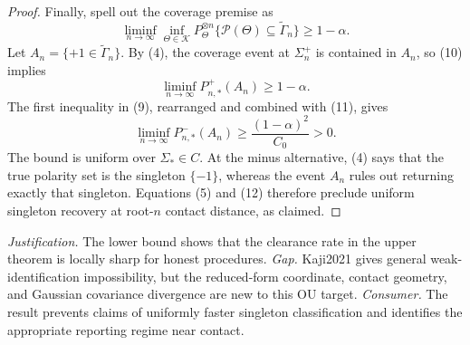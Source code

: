 \documentclass{article}
\begin{document}
\begin{proof}
Finally, spell out the coverage premise as
\[
 \liminf_{n\to\infty}\inf_{\Theta\in\mathcal K}
 P_\Theta^{\otimes n}
 \{\mathcal P(\Theta)\subseteq\widetilde\Gamma_n\}
 \ge1-\alpha. \tag{10}
\]
Let \(A_n=\{+1\in\widetilde\Gamma_n\}\).  By (4), the coverage event at \(\Sigma_n^+\) is contained in \(A_n\), so (10) implies
\[
 \liminf_{n\to\infty}P_{n,*}^+(A_n)\ge1-\alpha. \tag{11}
\]
The first inequality in (9), rearranged and combined with (11), gives
\[
 \liminf_{n\to\infty}P_{n,*}^-(A_n)
 \ge \frac{(1-\alpha)^2}{C_0}>0. \tag{12}
\]
The bound is uniform over \(\Sigma_*\in C\).  At the minus alternative, (4) says that the true polarity set is the singleton \(\{-1\}\), whereas the event \(A_n\) rules out returning exactly that singleton.  Equations (5) and (12) therefore preclude uniform singleton recovery at root-\(n\) contact distance, as claimed.
\end{proof}
\par\smallskip\noindent \textit{Justification.} The lower bound shows that the clearance rate in the upper theorem is locally sharp for honest procedures. \textit{Gap.} Kaji2021 gives general weak-identification impossibility, but the reduced-form coordinate, contact geometry, and Gaussian covariance divergence are new to this OU target. \textit{Consumer.} The result prevents claims of uniformly faster singleton classification and identifies the appropriate reporting regime near contact.
\end{document}
